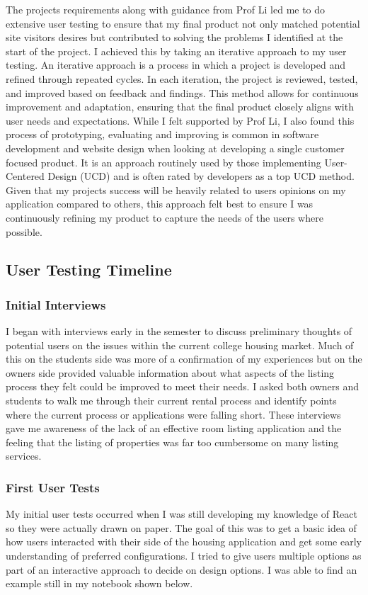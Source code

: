 \documentclass[10pt,twocolumn]{article}
\begin{document}
The projects requirements along with guidance from Prof Li led me to do extensive user testing to ensure that my final product not only matched potential site visitors desires but contributed to solving the problems I identified at the start of the project. I achieved this by taking an iterative approach to my user testing. An iterative approach is a process in which a project is developed and refined through repeated cycles. In each iteration, the project is reviewed, tested, and improved based on feedback and findings. This method allows for continuous improvement and adaptation, ensuring that the final product closely aligns with user needs and expectations. While I felt supported by Prof Li, I also found this process of prototyping, evaluating and improving is common in software development and website design when looking at developing a single customer focused product. \cite{greer2004software} It is an approach routinely used by those implementing User-Centered Design (UCD) and is often rated by developers as a top UCD method. \cite{vredenburg2002survey} Given that my projects success will be heavily related to users opinions on my application compared to others, this approach felt best to ensure I was continuously refining my product to capture the needs of the users where possible.  

\subsection{User Testing Timeline}
\subsubsection{Initial Interviews}
I began with interviews early in the semester to discuss preliminary thoughts of potential users on the issues within the current college housing market. Much of this on the students side was more of a confirmation of my experiences but on the owners side provided valuable information about what aspects of the listing process they felt could be improved to meet their needs. I asked both owners and students to walk me through their current rental process and identify points where the current process or applications were falling short. These interviews gave me awareness of the lack of an effective room listing application and the feeling that the listing of properties was far too cumbersome on many listing services. 

\subsubsection{First User Tests}
My initial user tests occurred when I was still developing my knowledge of React so they were actually drawn on paper. The goal of this was to get a basic idea of how users interacted with their side of the housing application and get some early understanding of preferred configurations.  I tried to give users multiple options as part of an interactive approach to decide on design options. I was able to find an example still in my notebook shown below. \\
\end{document}
